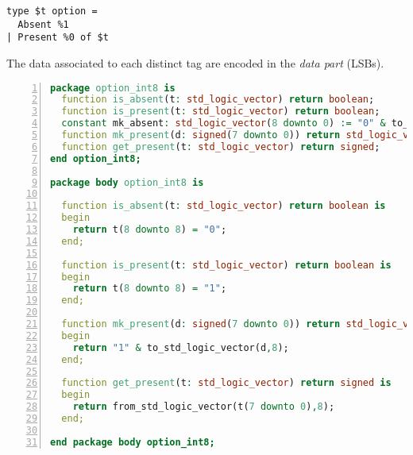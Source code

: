 \begin{verbatim}
type $t option = 
  Absent %1
| Present %0 of $t
\end{verbatim}

The data associated to each distinct tag are encoded in the \emph{data part} (LSBs).

\begin{lstlisting}[language=VHDL,frame=single,numbers=left,caption={Code generated by the VHDL
    backend for the \texttt{option} type declaration},label={lst:optiont-vhd}]
package option_int8 is
  function is_absent(t: std_logic_vector) return boolean;
  function is_present(t: std_logic_vector) return boolean;
  constant mk_absent: std_logic_vector(8 downto 0) := "0" & to_std_logic_vector(to_signed(0,8),8);
  function mk_present(d: signed(7 downto 0)) return std_logic_vector;
  function get_present(t: std_logic_vector) return signed;
end option_int8;

package body option_int8 is

  function is_absent(t: std_logic_vector) return boolean is
  begin
    return t(8 downto 8) = "0";
  end;

  function is_present(t: std_logic_vector) return boolean is
  begin
    return t(8 downto 8) = "1";
  end;

  function mk_present(d: signed(7 downto 0)) return std_logic_vector is
  begin
    return "1" & to_std_logic_vector(d,8);
  end;

  function get_present(t: std_logic_vector) return signed is
  begin
    return from_std_logic_vector(t(7 downto 0),8);
  end;

end package body option_int8;
\end{lstlisting}

